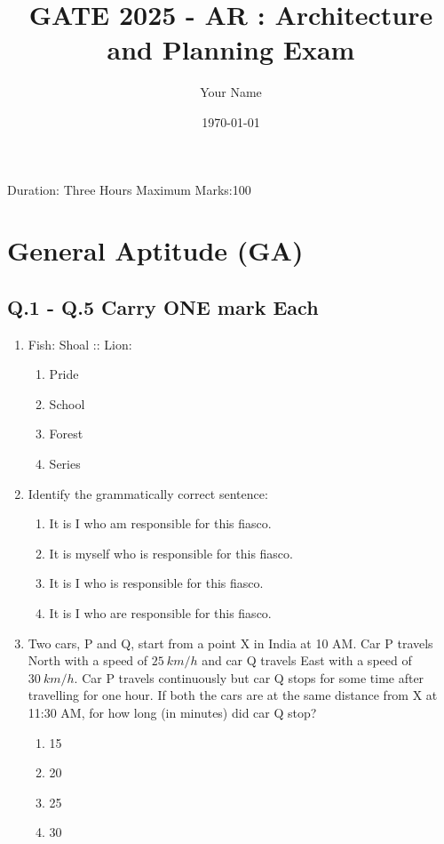 \documentclass[a4paper,10pt]{article}
\begin{document}
\title{GATE 2025 - AR : Architecture and Planning Exam}
\author{Your Name}
\date{\today}
\maketitle

Duration: Three Hours \hfill Maximum Marks:100

\section*{General Aptitude (GA)}
\subsection*{Q.1 - Q.5 Carry ONE mark Each}
\begin{enumerate}
    \item Fish: Shoal :: Lion:
    \begin{multicols}{4}
    \begin{enumerate}
        \item Pride
        \item School
        \item Forest
        \item Series
    \end{enumerate}
    \end{multicols}

    \item Identify the grammatically correct sentence:
    \begin{enumerate}
        \item It is I who am responsible for this fiasco.
        \item It is myself who is responsible for this fiasco.
        \item It is I who is responsible for this fiasco.
        \item It is I who are responsible for this fiasco.
    \end{enumerate}

    \item Two cars, P and Q, start from a point X in India at 10 AM. Car P travels North with a speed of $25~km/h$ and car Q travels East with a speed of $30~km/h.$ Car P travels continuously but car Q stops for some time after travelling for one hour. If both the cars are at the same distance from X at 11:30 AM, for how long (in minutes) did car Q stop?
    \begin{multicols}{4}
    \begin{enumerate}
        \item 15
        \item 20
        \item 25
        \item 30
    \end{enumerate}
    \end{multicols}


\end{enumerate}
\end{document}
